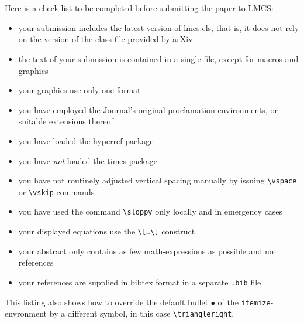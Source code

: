 \documentclass{lmcs} %
\theoremstyle{plain}\newtheorem{satz}[thm]{Satz} %
\begin{document}
\section{}
  Here is a check-list to be completed before submitting the paper to
  LMCS:
\begin{itemize}[label=$\triangleright$]
\item your submission includes the latest version of lmcs.cls, that is, it does
  not rely on the version of the class file provided by arXiv
\item the text of your submission is contained in a single file,
  except for macros and graphics
\item your graphics use only one format
\item you have employed the Journal's original proclamation environments,
  or suitable extensions thereof
\item you have loaded the hyperref package
\item you have \emph{not} loaded the times package
\item you have not routinely adjusted vertical spacing manually by issuing
  \texttt{\textbackslash vspace} or \texttt{\textbackslash vskip} commands
\item you have used the command \texttt{\textbackslash sloppy} only
  locally and in emergency cases
\item your displayed equations use the
  \texttt{\textbackslash[\dots\textbackslash]} construct
\item your abstract only contains as few math-expressions as possible and no
  references
\item your references are supplied in bibtex format in a separate \verb|.bib| file
\end{itemize}

  This listing also shows how to override the default bullet $\bullet$
  of the \texttt{itemize}-envronment by a different symbol, in this
  case \texttt{\textbackslash triangleright}.
\end{document}
